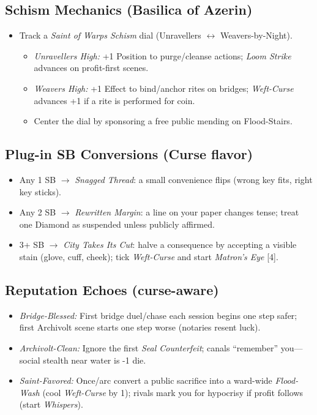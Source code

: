 \subsection*{Schism Mechanics (Basilica of Azerin)}
\begin{itemize}
  \item Track a \emph{Saint of Warps Schism} dial (Unravellers \(\leftrightarrow\) Weavers-by-Night).
  \begin{itemize}
    \item \emph{Unravellers High:} +1 Position to purge/cleanse actions; \emph{Loom Strike} advances on profit-first scenes.
    \item \emph{Weavers High:} +1 Effect to bind/anchor rites on bridges; \emph{Weft-Curse} advances +1 if a rite is performed for coin.
    \item Center the dial by sponsoring a free public mending on Flood-Stairs.
  \end{itemize}
\end{itemize}

\subsection*{Plug-in SB Conversions (Curse flavor)}
\begin{itemize}
  \item Any 1 SB $\rightarrow$ \emph{Snagged Thread}: a small convenience flips (wrong key fits, right key sticks).  
  \item Any 2 SB $\rightarrow$ \emph{Rewritten Margin}: a line on your paper changes tense; treat one Diamond as suspended unless publicly affirmed.  
  \item 3+ SB $\rightarrow$ \emph{City Takes Its Cut}: halve a consequence by accepting a visible stain (glove, cuff, cheek); tick \emph{Weft-Curse} and start \emph{Matron’s Eye} [4].
\end{itemize}

\subsection*{Reputation Echoes (curse-aware)}
\begin{itemize}
  \item \emph{Bridge-Blessed:} First bridge duel/chase each session begins one step safer; first Archivolt scene starts one step worse (notaries resent luck).  
  \item \emph{Archivolt-Clean:} Ignore the first \emph{Seal Counterfeit}; canals “remember” you—social stealth near water is -1 die.  
  \item \emph{Saint-Favored:} Once/arc convert a public sacrifice into a ward-wide \emph{Flood-Wash} (cool \emph{Weft-Curse} by 1); rivals mark you for hypocrisy if profit follows (start \emph{Whispers}).
\end{itemize}